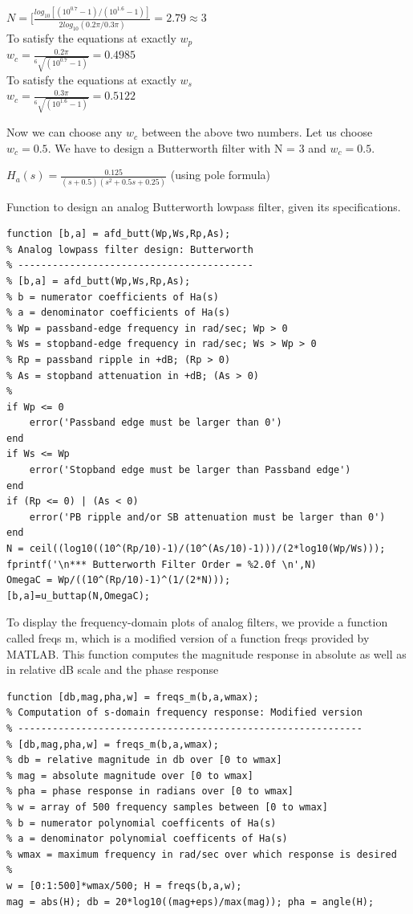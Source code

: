\documentclass{article}
\begin{document}
\begin{center}
$N = [\frac{log_{10}[(10^{0.7}-1)/(10^{1.6}-1)]}{2log_{10}(0.2\pi/0.3 \pi)}=2.79 \approx 3$ \\
\vspace{1em}
To satisfy the equations at exactly $w_p$ \\
$w_c=\frac{0.2\pi}{^6\sqrt{(10^{0.7}-1)}}=0.4985$ \\
To satisfy the equations at exactly $w_s$ \\
$w_c=\frac{0.3\pi}{^6\sqrt{(10^{1.6}-1)}}=0.5122$
\end{center}
Now we can choose any $w_c$ between the above two numbers. Let us choose $w_c = 0.5$. We have to design a Butterworth filter with N = 3 and $w_c = 0.5$. 
\begin{center}
$H_a(s)=\frac{0.125}{(s+0.5)(s^2+0.5s+0.25)}$ (using pole formula)
\end{center}
Function to design an analog Butterworth lowpass filter, given its specifications.
\begin{lstlisting}
function [b,a] = afd_butt(Wp,Ws,Rp,As);
% Analog lowpass filter design: Butterworth
% -----------------------------------------
% [b,a] = afd_butt(Wp,Ws,Rp,As);
% b = numerator coefficients of Ha(s)
% a = denominator coefficients of Ha(s)
% Wp = passband-edge frequency in rad/sec; Wp > 0
% Ws = stopband-edge frequency in rad/sec; Ws > Wp > 0
% Rp = passband ripple in +dB; (Rp > 0)
% As = stopband attenuation in +dB; (As > 0)
%
if Wp <= 0
    error('Passband edge must be larger than 0')
end
if Ws <= Wp
    error('Stopband edge must be larger than Passband edge')
end
if (Rp <= 0) | (As < 0)
    error('PB ripple and/or SB attenuation must be larger than 0')
end
N = ceil((log10((10^(Rp/10)-1)/(10^(As/10)-1)))/(2*log10(Wp/Ws)));
fprintf('\n*** Butterworth Filter Order = %2.0f \n',N)
OmegaC = Wp/((10^(Rp/10)-1)^(1/(2*N)));
[b,a]=u_buttap(N,OmegaC);    
\end{lstlisting}
To display the frequency-domain plots of analog filters, we provide a
function called freqs m, which is a modified version of a function freqs
provided by MATLAB. This function computes the magnitude response
in absolute as well as in relative dB scale and the phase response
\begin{lstlisting}
function [db,mag,pha,w] = freqs_m(b,a,wmax);
% Computation of s-domain frequency response: Modified version
% ------------------------------------------------------------
% [db,mag,pha,w] = freqs_m(b,a,wmax);
% db = relative magnitude in db over [0 to wmax]
% mag = absolute magnitude over [0 to wmax]
% pha = phase response in radians over [0 to wmax]
% w = array of 500 frequency samples between [0 to wmax]
% b = numerator polynomial coefficents of Ha(s)
% a = denominator polynomial coefficents of Ha(s)
% wmax = maximum frequency in rad/sec over which response is desired
%
w = [0:1:500]*wmax/500; H = freqs(b,a,w);
mag = abs(H); db = 20*log10((mag+eps)/max(mag)); pha = angle(H);    
\end{lstlisting}
\end{document}
